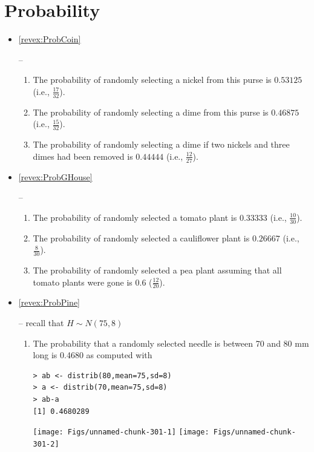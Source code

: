 \documentclass[10pt,openany]{book}\usepackage[]{graphicx}\usepackage[]{color}
\makeatletter
\newenvironment{kframe}{%
 \def\at@end@of@kframe{}%
 \ifinner\ifhmode%
  \def\at@end@of@kframe{\end{minipage}}%
  \begin{minipage}{\columnwidth}%
 \fi\fi%
 \def\FrameCommand##1{\hskip\@totalleftmargin \hskip-\fboxsep
 \colorbox{shadecolor}{##1}\hskip-\fboxsep
     \hskip-\linewidth \hskip-\@totalleftmargin \hskip\columnwidth}%
 \MakeFramed {\advance\hsize-\width
   \@totalleftmargin\z@ \linewidth\hsize
   \@setminipage}}%
 {\par\unskip\endMakeFramed%
 \at@end@of@kframe}
\newenvironment{knitrout}{}{} %
\makeatother
\begin{document}
\section*{Probability}
\begin{itemize}
  \item \hypertarget{ans:ProbCoin}{\ref{revex:ProbCoin}} --
  \begin{enumerate}
    \item The probability of randomly selecting a nickel from this purse is $0.53125$ (i.e., $\frac{17}{32}$).
    \item The probability of randomly selecting a dime from this purse is $0.46875$ (i.e., $\frac{15}{32}$).
    \item The probability of randomly selecting a dime if two nickels and three dimes had been removed is $0.44444$ (i.e., $\frac{12}{27}$).
  \end{enumerate}

  \item \hypertarget{ans:ProbGHouse}{\ref{revex:ProbGHouse}} --
  \begin{enumerate}
    \item The probability of randomly selected a tomato plant is $0.33333$ (i.e., $\frac{10}{30}$).
    \item The probability of randomly selected a cauliflower plant is $0.26667$ (i.e., $\frac{8}{30}$).
    \item The probability of randomly selected a pea plant assuming that all tomato plants were gone is $0.6$ ($\frac{12}{20}$).
  \end{enumerate}

  \item \hypertarget{ans:ProbPine}{\ref{revex:ProbPine}} -- recall that $H\sim N(75,8)$
  \begin{enumerate}
    \item The probability that a randomly selected needle is between 70 and 80 mm long is 0.4680 as computed with
\begin{knitrout}
\color{fgcolor}\begin{kframe}
\begin{verbatim}
> ab <- distrib(80,mean=75,sd=8)
> a <- distrib(70,mean=75,sd=8)
> ab-a
[1] 0.4680289
\end{verbatim}
\end{kframe}

{\centering \texttt{[image: Figs/unnamed-chunk-301-1]} 
\texttt{[image: Figs/unnamed-chunk-301-2]} 

}
\end{knitrout}
\end{enumerate}
\end{itemize}
\end{document}
